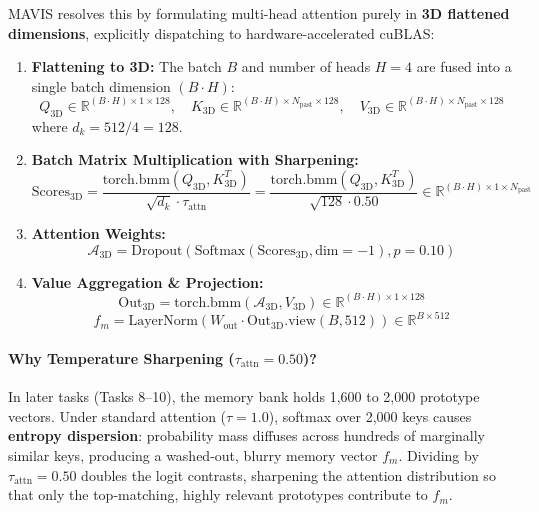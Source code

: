 \documentclass[11pt,a4paper]{article}
\begin{document}
MAVIS resolves this by formulating multi-head attention purely in \textbf{3D flattened dimensions}, explicitly dispatching to hardware-accelerated cuBLAS:
\begin{enumerate}
    \item \textbf{Flattening to 3D:} The batch $B$ and number of heads $H = 4$ are fused into a single batch dimension $(B \cdot H)$:
    \begin{equation}
    Q_{\text{3D}} \in \mathbb{R}^{(B \cdot H) \times 1 \times 128}, \quad K_{\text{3D}} \in \mathbb{R}^{(B \cdot H) \times N_{\text{past}} \times 128}, \quad V_{\text{3D}} \in \mathbb{R}^{(B \cdot H) \times N_{\text{past}} \times 128}
    \end{equation}
    where $d_k = 512 / 4 = 128$.
    \item \textbf{Batch Matrix Multiplication with Sharpening:}
    \begin{equation}
    \text{Scores}_{\text{3D}} = \frac{\text{torch.bmm}(Q_{\text{3D}}, K_{\text{3D}}^T)}{\sqrt{d_k} \cdot \tau_{\text{attn}}} = \frac{\text{torch.bmm}(Q_{\text{3D}}, K_{\text{3D}}^T)}{\sqrt{128} \cdot 0.50} \in \mathbb{R}^{(B \cdot H) \times 1 \times N_{\text{past}}}
    \end{equation}
    \item \textbf{Attention Weights:}
    \begin{equation}
    \mathcal{A}_{\text{3D}} = \text{Dropout}\left(\text{Softmax}(\text{Scores}_{\text{3D}}, \text{dim}=-1), p=0.10\right)
    \end{equation}
    \item \textbf{Value Aggregation \& Projection:}
    \begin{equation}
    \text{Out}_{\text{3D}} = \text{torch.bmm}(\mathcal{A}_{\text{3D}}, V_{\text{3D}}) \in \mathbb{R}^{(B \cdot H) \times 1 \times 128}
    \end{equation}
    \begin{equation}
    f_m = \text{LayerNorm}\left( W_{\text{out}} \cdot \text{Out}_{\text{3D}}.\text{view}(B, 512) \right) \in \mathbb{R}^{B \times 512}
    \end{equation}
\end{enumerate}

\paragraph{Why Temperature Sharpening ($\tau_{\text{attn}} = 0.50$)?}
In later tasks (Tasks 8--10), the memory bank holds 1,600 to 2,000 prototype vectors. Under standard attention ($\tau = 1.0$), softmax over 2,000 keys causes \textbf{entropy dispersion}: probability mass diffuses across hundreds of marginally similar keys, producing a washed-out, blurry memory vector $f_m$. Dividing by $\tau_{\text{attn}} = 0.50$ doubles the logit contrasts, sharpening the attention distribution so that only the top-matching, highly relevant prototypes contribute to $f_m$.
\end{document}
